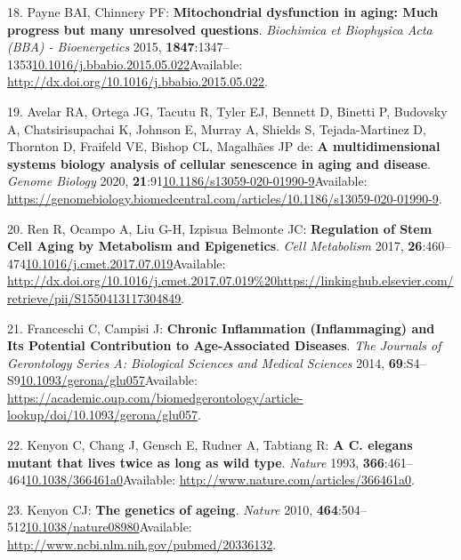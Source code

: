 \documentclass[
]{book}
\begin{document}
\leavevmode\hypertarget{ref-Payne2015}{}%
18. Payne BAI, Chinnery PF: \textbf{Mitochondrial dysfunction in aging: Much progress but many unresolved questions}. \emph{Biochimica et Biophysica Acta (BBA) - Bioenergetics} 2015, \textbf{1847}:1347--1353\href{https://doi.org/10.1016/j.bbabio.2015.05.022}{10.1016/j.bbabio.2015.05.022}Available: \url{http://dx.doi.org/10.1016/j.bbabio.2015.05.022}.

\leavevmode\hypertarget{ref-Avelar2020}{}%
19. Avelar RA, Ortega JG, Tacutu R, Tyler EJ, Bennett D, Binetti P, Budovsky A, Chatsirisupachai K, Johnson E, Murray A, Shields S, Tejada-Martinez D, Thornton D, Fraifeld VE, Bishop CL, Magalhães JP de: \textbf{A multidimensional systems biology analysis of cellular senescence in aging and disease}. \emph{Genome Biology} 2020, \textbf{21}:91\href{https://doi.org/10.1186/s13059-020-01990-9}{10.1186/s13059-020-01990-9}Available: \url{https://genomebiology.biomedcentral.com/articles/10.1186/s13059-020-01990-9}.

\leavevmode\hypertarget{ref-Ren2017}{}%
20. Ren R, Ocampo A, Liu G-H, Izpisua Belmonte JC: \textbf{Regulation of Stem Cell Aging by Metabolism and Epigenetics}. \emph{Cell Metabolism} 2017, \textbf{26}:460--474\href{https://doi.org/10.1016/j.cmet.2017.07.019}{10.1016/j.cmet.2017.07.019}Available: \url{http://dx.doi.org/10.1016/j.cmet.2017.07.019\%20https://linkinghub.elsevier.com/retrieve/pii/S1550413117304849}.

\leavevmode\hypertarget{ref-Franceschi2014}{}%
21. Franceschi C, Campisi J: \textbf{Chronic Inflammation (Inflammaging) and Its Potential Contribution to Age-Associated Diseases}. \emph{The Journals of Gerontology Series A: Biological Sciences and Medical Sciences} 2014, \textbf{69}:S4--S9\href{https://doi.org/10.1093/gerona/glu057}{10.1093/gerona/glu057}Available: \url{https://academic.oup.com/biomedgerontology/article-lookup/doi/10.1093/gerona/glu057}.

\leavevmode\hypertarget{ref-Kenyon1993a}{}%
22. Kenyon C, Chang J, Gensch E, Rudner A, Tabtiang R: \textbf{A C. elegans mutant that lives twice as long as wild type}. \emph{Nature} 1993, \textbf{366}:461--464\href{https://doi.org/10.1038/366461a0}{10.1038/366461a0}Available: \url{http://www.nature.com/articles/366461a0}.

\leavevmode\hypertarget{ref-Kenyon2010a}{}%
23. Kenyon CJ: \textbf{The genetics of ageing}. \emph{Nature} 2010, \textbf{464}:504--512\href{https://doi.org/10.1038/nature08980}{10.1038/nature08980}Available: \url{http://www.ncbi.nlm.nih.gov/pubmed/20336132}.
\end{document}
